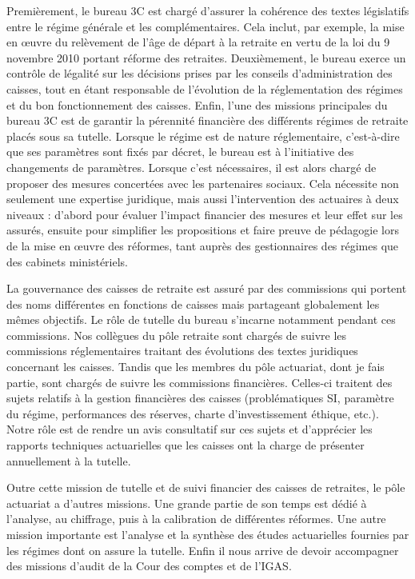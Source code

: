 Premièrement, le bureau 3C est chargé d'assurer la cohérence des textes législatifs entre le régime générale et les complémentaires. Cela inclut, par exemple, la mise en œuvre du relèvement de l'âge de départ à la retraite en vertu de la loi du 9 novembre 2010 portant réforme des retraites. 
Deuxièmement, le bureau exerce un contrôle de légalité sur les décisions prises par les conseils d'administration des caisses, tout en étant responsable de l'évolution de la réglementation des régimes et du bon fonctionnement des caisses.
Enfin, l'une des missions principales du bureau 3C est de garantir la pérennité financière des différents régimes de retraite placés sous sa tutelle. Lorsque le régime est de nature réglementaire, c'est-à-dire que ses paramètres sont fixés par décret, le bureau est à l'initiative des changements de paramètres. Lorsque c'est nécessaires, il est alors chargé de proposer des mesures concertées avec les partenaires sociaux. Cela nécessite non seulement une expertise juridique, mais aussi l'intervention des actuaires à deux niveaux : d'abord pour évaluer l'impact financier des mesures et leur effet sur les assurés, ensuite pour simplifier les propositions et faire preuve de pédagogie lors de la mise en œuvre des réformes, tant auprès des gestionnaires des régimes que des cabinets ministériels.

La gouvernance des caisses de retraite est assuré par des commissions qui portent des noms différentes en fonctions de caisses mais partageant globalement les mêmes objectifs. Le rôle de tutelle du bureau s'incarne notamment pendant ces commissions. Nos collègues du pôle retraite sont chargés de suivre les commissions réglementaires traitant des évolutions des textes juridiques concernant les caisses. Tandis que les membres du pôle actuariat, dont je fais partie, sont chargés de suivre les commissions financières. Celles-ci traitent des sujets relatifs à la gestion financières des caisses (problématiques SI, paramètre du régime, performances des réserves, charte d'investissement éthique, etc.). Notre rôle est de rendre un avis consultatif sur ces sujets et d’apprécier les rapports techniques actuarielles que les caisses ont la charge de présenter annuellement à la tutelle.

Outre cette mission de tutelle et de suivi financier des caisses de retraites, le pôle actuariat a d'autres missions. Une grande partie de son temps est dédié à l'analyse, au chiffrage, puis à la calibration de différentes réformes.
Une autre mission importante est l'analyse et la synthèse des études actuarielles fournies par les régimes dont on assure la tutelle. Enfin il nous arrive de devoir accompagner des missions d'audit de la Cour des comptes et de l'IGAS.

